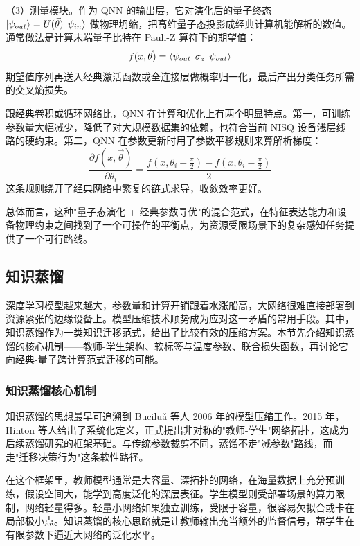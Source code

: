 （3）测量模块。作为 QNN 的输出层，它对演化后的量子终态 $\ket{\psi_{out}} = U(\vec{\theta})\ket{\psi_{in}}$ 做物理坍缩，把高维量子态投影成经典计算机能解析的数值。通常做法是计算末端量子比特在 Pauli-Z 算符下的期望值：
\begin{equation}
f(x, \vec{\theta}) = \bra{\psi_{out}} \sigma_z \ket{\psi_{out}}
\end{equation}
期望值序列再送入经典激活函数或全连接层做概率归一化，最后产出分类任务所需的交叉熵损失。

跟经典卷积或循环网络比，QNN 在计算和优化上有两个明显特点。第一，可训练参数量大幅减少，降低了对大规模数据集的依赖，也符合当前 NISQ 设备浅层线路的硬约束。第二，QNN 在参数更新时用了参数平移规则来算解析梯度：
\begin{equation}
\frac{\partial f(x, \vec{\theta})}{\partial \theta_i} = \frac{f(x, \theta_i + \frac{\pi}{2}) - f(x, \theta_i - \frac{\pi}{2})}{2}
\end{equation}
这条规则绕开了经典网络中繁复的链式求导，收敛效率更好。

总体而言，这种"量子态演化 + 经典参数寻优"的混合范式，在特征表达能力和设备物理约束之间找到了一个可操作的平衡点，为资源受限场景下的复杂感知任务提供了一个可行路线。

\subsection{知识蒸馏}
深度学习模型越来越大，参数量和计算开销跟着水涨船高，大网络很难直接部署到资源紧张的边缘设备上。模型压缩技术顺势成为应对这一矛盾的常用手段。其中，知识蒸馏作为一类知识迁移范式，给出了比较有效的压缩方案。本节先介绍知识蒸馏的核心机制——教师-学生架构、软标签与温度参数、联合损失函数，再讨论它向经典-量子跨计算范式迁移的可能。

\subsubsection{知识蒸馏核心机制}
知识蒸馏的思想最早可追溯到 Buciluǎ 等人 2006 年的模型压缩工作。2015 年，Hinton 等人给出了系统化定义，正式提出非对称的"教师-学生"网络拓扑，这成为后续蒸馏研究的框架基础。与传统参数裁剪不同，蒸馏不走"减参数"路线，而走"迁移决策行为"这条软性路径。

在这个框架里，教师模型通常是大容量、深拓扑的网络，在海量数据上充分预训练，假设空间大，能学到高度泛化的深层表征。学生模型则受部署场景的算力限制，网络轻量得多。轻量小网络如果独立训练，受限于容量，很容易欠拟合或卡在局部极小点。知识蒸馏的核心思路就是让教师输出充当额外的监督信号，帮学生在有限参数下逼近大网络的泛化水平。

